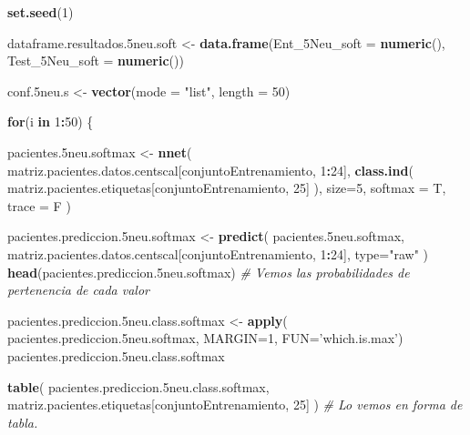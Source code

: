 \documentclass[]{article}
\newenvironment{Shaded}{\begin{snugshade}}{\end{snugshade}}
\newcommand{\CommentTok}[1]{\textcolor[rgb]{0.56,0.35,0.01}{\textit{#1}}}
\newcommand{\ControlFlowTok}[1]{\textcolor[rgb]{0.13,0.29,0.53}{\textbf{#1}}}
\newcommand{\DataTypeTok}[1]{\textcolor[rgb]{0.13,0.29,0.53}{#1}}
\newcommand{\DecValTok}[1]{\textcolor[rgb]{0.00,0.00,0.81}{#1}}
\newcommand{\FloatTok}[1]{\textcolor[rgb]{0.00,0.00,0.81}{#1}}
\newcommand{\KeywordTok}[1]{\textcolor[rgb]{0.13,0.29,0.53}{\textbf{#1}}}
\newcommand{\NormalTok}[1]{#1}
\newcommand{\OperatorTok}[1]{\textcolor[rgb]{0.81,0.36,0.00}{\textbf{#1}}}
\newcommand{\StringTok}[1]{\textcolor[rgb]{0.31,0.60,0.02}{#1}}
\begin{document}
\begin{Shaded}
\begin{Highlighting}[]
\KeywordTok{set.seed}\NormalTok{(}\DecValTok{1}\NormalTok{)}

\NormalTok{dataframe.resultados}\FloatTok{.5}\NormalTok{neu.soft <-}\StringTok{ }\KeywordTok{data.frame}\NormalTok{(}\DataTypeTok{Ent_5Neu_soft =} \KeywordTok{numeric}\NormalTok{(),}
                                             \DataTypeTok{Test_5Neu_soft =} \KeywordTok{numeric}\NormalTok{())}

\NormalTok{conf}\FloatTok{.5}\NormalTok{neu.s <-}\StringTok{ }\KeywordTok{vector}\NormalTok{(}\DataTypeTok{mode =} \StringTok{"list"}\NormalTok{, }\DataTypeTok{length =} \DecValTok{50}\NormalTok{)}

\ControlFlowTok{for}\NormalTok{(i }\ControlFlowTok{in} \DecValTok{1}\OperatorTok{:}\DecValTok{50}\NormalTok{)}
\NormalTok{\{}

\NormalTok{  pacientes}\FloatTok{.5}\NormalTok{neu.softmax <-}\StringTok{ }\KeywordTok{nnet}\NormalTok{( matriz.pacientes.datos.centscal[conjuntoEntrenamiento, }\DecValTok{1}\OperatorTok{:}\DecValTok{24}\NormalTok{],}
                                  \KeywordTok{class.ind}\NormalTok{( matriz.pacientes.etiquetas[conjuntoEntrenamiento, }\DecValTok{25}\NormalTok{] ),}
                                  \DataTypeTok{size=}\DecValTok{5}\NormalTok{,}
                                  \DataTypeTok{softmax =}\NormalTok{ T,}
                                  \DataTypeTok{trace =}\NormalTok{ F )}
  
\NormalTok{  pacientes.prediccion}\FloatTok{.5}\NormalTok{neu.softmax <-}\StringTok{ }\KeywordTok{predict}\NormalTok{( pacientes}\FloatTok{.5}\NormalTok{neu.softmax, matriz.pacientes.datos.centscal[conjuntoEntrenamiento, }\DecValTok{1}\OperatorTok{:}\DecValTok{24}\NormalTok{], }\DataTypeTok{type=}\StringTok{"raw"}\NormalTok{ )}
  \KeywordTok{head}\NormalTok{(pacientes.prediccion}\FloatTok{.5}\NormalTok{neu.softmax) }\CommentTok{# Vemos las probabilidades de pertenencia de cada valor}
  
\NormalTok{  pacientes.prediccion}\FloatTok{.5}\NormalTok{neu.class.softmax <-}\StringTok{ }\KeywordTok{apply}\NormalTok{( pacientes.prediccion}\FloatTok{.5}\NormalTok{neu.softmax, }\DataTypeTok{MARGIN=}\DecValTok{1}\NormalTok{, }\DataTypeTok{FUN=}\StringTok{'which.is.max'}\NormalTok{)}
\NormalTok{  pacientes.prediccion}\FloatTok{.5}\NormalTok{neu.class.softmax}
  
  \KeywordTok{table}\NormalTok{( pacientes.prediccion}\FloatTok{.5}\NormalTok{neu.class.softmax, matriz.pacientes.etiquetas[conjuntoEntrenamiento, }\DecValTok{25}\NormalTok{] )  }\CommentTok{# Lo vemos en forma de tabla.}
  

\end{Highlighting}
\end{Shaded}
\end{document}
